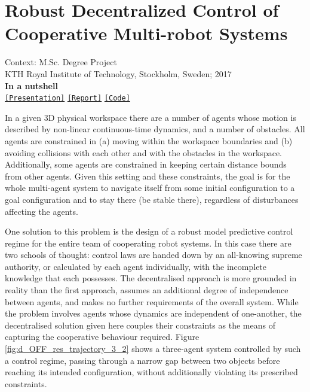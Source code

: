 \chapter{Robust Decentralized Control of Cooperative Multi-robot Systems}

\noindent Context: M.Sc. Degree Project\\
\noindent KTH Royal Institute of Technology, Stockholm, Sweden; 2017\\

\noindent \textbf{In a nutshell}\\
\noindent\href{https://github.com/li9i/KTH_thesis_presentation}{\texttt{[Presentation]}} \href{https://github.com/li9i/KTH_thesis_presentation}{\texttt{[Report]}}  \href{https://github.com/li9i/KTH_thesis_simulations}{\texttt{[Code]}} \\

\begin{problem}
In a given 3D physical workspace there are a number of agents whose motion is
described by non-linear continuous-time dynamics, and a number of obstacles.
All agents are constrained in (a) moving within the workspace boundaries and
(b) avoiding collisions with each other and with the obstacles in the
workspace. Additionally, some agents are constrained in keeping certain
distance bounds from other agents. Given this setting and these constraints,
the goal is for the whole multi-agent system to navigate itself from some
initial configuration to a goal configuration and to stay there (be stable
there), regardless of disturbances affecting the agents.
\end{problem}

One solution to this problem is the design of a robust model predictive control
regime for the entire team of cooperating robot systems. In this case there are
two schools of thought: control laws are handed down by an all-knowing supreme
authority, or calculated by each agent individually, with the incomplete
knowledge that each possesses. The decentralised approach is more grounded in
reality than the first approach, assumes an additional degree of independence
between agents, and makes no further requirements of the overall system. While
the problem involves agents whose dynamics are independent of one-another, the
decentralised solution given here couples their constraints as the means of
capturing the cooperative behaviour required.  Figure
\ref{fig:d_OFF_res_trajectory_3_2} shows a three-agent system controlled by
such a control regime, passing through a narrow gap between two objects before
reaching its intended configuration, without additionally violating its
prescribed constraints.

